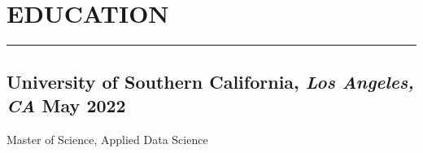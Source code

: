 \documentclass[10pt]{article}
\begin{document}


\vspace{0.1in}

\section*{\MakeUppercase{Education}}
\hrule
\medskip
\subsection*{University of Southern California{\normalfont, \textit{Los Angeles, CA} \hfill May 2022}}
Master of Science, Applied Data Science
\end{document}
